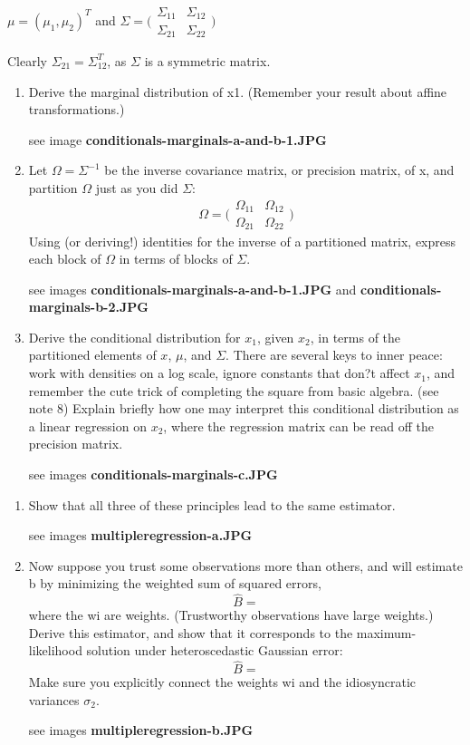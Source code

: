 \documentclass{homework}
\begin{document}
$\mu = (\mu_1,\mu_2)^T$ and $\Sigma = \big( \begin{matrix} \Sigma_{11} & \Sigma_{12} \\ \Sigma_{21} & \Sigma_{22}\end{matrix} \big)$

Clearly $\Sigma_{21} = \Sigma_{12}^T$, as $\Sigma$ is a symmetric matrix.
\begin{enumerate}[label=(\Alph*)]
\item Derive the marginal distribution of x1. (Remember your result about affine transformations.)
\par * see image \textbf{conditionals-marginals-a-and-b-1.JPG}

\item Let $\Omega = \Sigma^{-1}$ be the inverse covariance matrix, or precision matrix, of x, and partition $\Omega$ just as you did $\Sigma$:
$$\Omega = \big( \begin{matrix} \Omega_{11} & \Omega_{12} \\ \Omega_{21} & \Omega_{22}\end{matrix} \big)$$
Using (or deriving!) identities for the inverse of a partitioned matrix, express each block of $\Omega$ in terms of blocks of $\Sigma$.
\par * see images \textbf{conditionals-marginals-a-and-b-1.JPG} and \textbf{conditionals-marginals-b-2.JPG}

\item Derive the conditional distribution for $x_1$, given $x_2$, in terms of the partitioned elements of $x$, $\mu$, and $\Sigma$. There are several keys to inner peace: work with densities on a log scale, ignore constants that don?t affect $x_1$, and remember the cute trick of completing the square from basic algebra. (see note 8) Explain briefly how one may interpret this conditional distribution as a linear regression on $x_2$, where the regression matrix can be read off the precision matrix.

\par * see images \textbf{conditionals-marginals-c.JPG} 

\end{enumerate}

\begin{enumerate}[label=(\Alph*)]
\item Show that all three of these principles lead to the same estimator.
\par * see images \textbf{multipleregression-a.JPG} 

\item Now suppose you trust some observations more than others, and will estimate b by minimizing the weighted sum of squared errors,
$$\hat{B} =  $$
where the wi are weights. (Trustworthy observations have large weights.) Derive this estimator, and show that it corresponds to the maximum-likelihood solution under heteroscedastic Gaussian error:
$$\hat{B} =  $$
Make sure you explicitly connect the weights wi and the idiosyncratic variances $\sigma_2$.
\par * see images \textbf{multipleregression-b.JPG} 
\end{enumerate}
\end{document}
